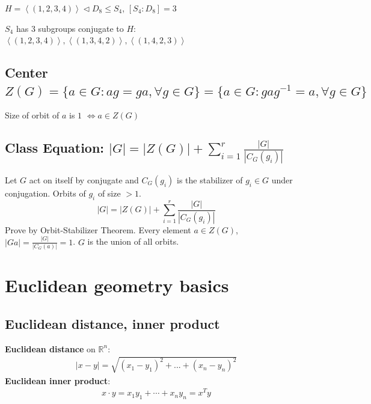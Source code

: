 \documentclass[11pt]{elegantbook}
\begin{document}
\begin{example}
$H=\left\langle (1,2,3,4)\right\rangle \lhd D_8 \leq S_4$, $[S_4:D_8]=3$
\end{example}
$S_4$ has $3$ subgroups conjugate to $H$: $\left\langle (1,2,3,4)\right\rangle,\left\langle (1,3,4,2)\right\rangle,\left\langle (1,4,2,3)\right\rangle$

\section{Center $Z(G)=\{a\in G:ag=ga,\forall g\in G\}=\{a\in G:gag^{-1}=a,\forall g\in G\}$}
Size of orbit of $a$ is $1$ $\Leftrightarrow a\in Z(G)$

\section{Class Equation: $|G|=|Z(G)|+\sum_{i=1}^r\frac{|G|}{|C_G(g_i)|}$}
Let $G$ act on itself by conjugate and $C_G(g_i)$ is the stabilizer of $g_i\in G$ under conjugation. Orbits of $g_i$ of size $>1$.
$$|G|=|Z(G)|+\sum_{i=1}^r\frac{|G|}{|C_G(g_i)|}$$
Prove by Orbit-Stabilizer Theorem. Every element $a\in Z(G)$, $|Ga|=\frac{|G|}{|C_G(a)|}=1$. $G$ is the union of all orbits.
















\chapter{Euclidean geometry basics}
\section{ Euclidean distance, inner product}
\textbf{Euclidean distance} on $\mathbb{R}^n$:
\begin{equation}
    \begin{aligned}
        |x-y|=\sqrt{(x_1-y_1)^2+...+(x_n-y_n)^2}
    \end{aligned}
    \nonumber
\end{equation}
\textbf{Euclidean inner product}:
\begin{equation}
    \begin{aligned}
        x\cdot y=x_1y_1+\cdots +x_ny_n=x^Ty
    \end{aligned}
    \nonumber
\end{equation}
\end{document}
